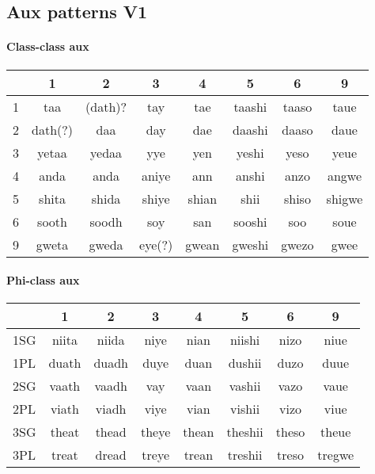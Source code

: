 \documentclass[8pt]{book}
\begin{document}
\subsection{Aux patterns V1}
\paragraph{Class-class aux}

\begin{center}
	\begin{tabular}{|l|c|c|c|c|c|c|c|}
	\hline
	& 1 & 2 & 3 & 4 & 5 & 6 & 9 \\ \hline
	1 & taa & (dath)? & tay & tae & taashi & taaso & taue \\ \hline
	2 & dath(?) & daa & day & dae & daashi & daaso & daue \\ \hline
	3 & yetaa & yedaa & yye & yen & yeshi & yeso & yeue \\ \hline
	4 & anda & anda & aniye & ann & anshi & anzo & angwe \\ \hline
	5 & shita & shida & shiye & shian & shii & shiso & shigwe \\ \hline
    6 & sooth & soodh & soy & san & sooshi & soo & soue \\ \hline
    9 & gweta & gweda & eye(?) & gwean & gweshi & gwezo & gwee \\ \hline
	\end{tabular}
\end{center}

\paragraph{Phi-class aux}
\begin{center}
	\begin{tabular}{|l|c|c|c|c|c|c|c|}
	\hline
	& 1 & 2 & 3 & 4 & 5 & 6 & 9 \\ \hline
    1SG & niita & niida & niye & nian & niishi & nizo & niue  \\ \hline
    1PL & duath & duadh & duye & duan & dushii & duzo & duue \\ \hline 
    2SG & vaath & vaadh & vay & vaan & vashii & vazo & vaue \\ \hline
    2PL & viath & viadh & viye & vian & vishii & vizo & viue \\ \hline
  	3SG & theat & thead & theye & thean & theshii & theso & theue \\ \hline
  	3PL & treat & dread & treye & trean & treshii & treso & tregwe \\ \hline
	\end{tabular}
\end{center}
\end{document}
